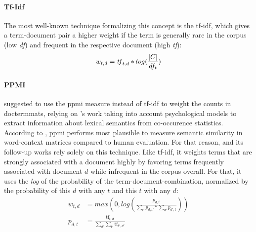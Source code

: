 \paragraph{Tf-Idf} The most well-known technique formalizing this concept is the \gls{tf-idf}, which gives a term-document pair a higher weight if the term is generally rare in the corpus (low \textit{df}) and frequent in the respective document (high \textit{tf}):
\vspace{-2.5ex}
$$ w_{t,d} = \text{\textit{tf}}_{t,d} * log(\frac{|C|}{df_t}) $$


\paragraph{PPMI}

\textcite{Turney2010} suggested to use the \gls{ppmi} measure instead of \gls{tf-idf} to weight the counts in \glspl{doctermmat}, relying on \cite{Bullinaria2007}'s work taking into account psychological models to extract information about lexical semantics from co-occurence statistics. According to \cite{Turney2010,Bullinaria2007}, \gls{ppmi} performs most plausible to measure semantic similarity in word-context matrices compared to human evaluation. For that reason, \textcite{Derrac2015} and its follow-up works \cite{Ager2018,Alshaikh2020} rely solely on this technique. %
Like tf-idf, it weights terms that are strongly associated with a document highly by favoring terms frequently associated with document $d$ while infrequent in the corpus overall. For that, it uses the \textit{log} of the probability of the term-document-combination, normalized by the probability of this $d$ with any $t$ and this $t$ with any $d$:
\vspace{-2.5ex}
\begin{align*}
   w_{t,d} &= max\left(0, log\left( \frac{p_{d,t}}{\sum_{t'}p_{d,t'}*\sum_{d'}p_{d',t}} \right) \right) \\
   p_{d,t} &= \frac{\text{tf}_{t,d}}{\sum_{d'}\sum_{t'} \text{tf}_{t',d'}}
\end{align*}

